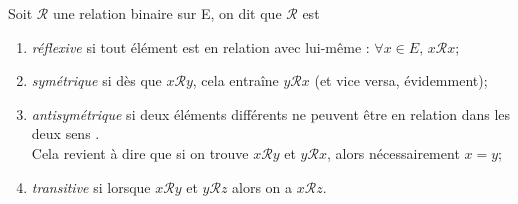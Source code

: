 \documentclass[a4paper,12pt,french]{book}
\begin{document}
\begin{definition}
Soit $\mathcal{R}$ une relation binaire sur E, on dit que $\mathcal{R}$ est
\begin{enumerate}[--]
	\item 	\textit{réflexive} si tout élément est en relation avec lui-même : $\forall x\in E,\, x\mathcal{R}x$;
	\item 	\textit{symétrique} si dès que $x\mathcal{R}y$, cela entraîne $y\mathcal{R}x$ (et vice versa, évidemment);
	\item 	\textit{antisymétrique} si deux éléments différents ne peuvent être en relation \og dans les deux sens \fg.\\
			Cela revient à dire que si on trouve $x\mathcal{R}y$ et $y\mathcal{R}x$, alors nécessairement $x=y$;
	\item 	\textit{transitive} si lorsque $x\mathcal{R}y$ et $y\mathcal{R}z$ alors on a $x\mathcal{R}z$.
\end{enumerate}
\end{definition}
\end{document}

